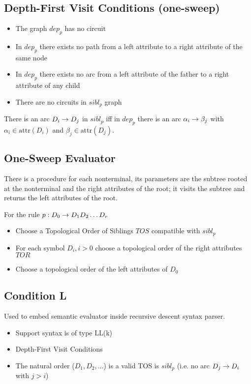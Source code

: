 \subsection{Depth-First Visit Conditions (one-sweep)}
\begin{itemize}
    \item The graph $dep_p$ has no circuit
    \item In $dep_p$ there exists no path from a left attribute to a right attribute of the same node
    \item In $dep_p$ there exists no arc from a left attribute of the father to a right attribute of any child
    \item There are no circuits in $sibl_p$ graph
\end{itemize}

There is an arc $D_i \rightarrow D_j$ in $sibl_p$ iff in $dep_p$ there is an arc $\alpha_i \rightarrow \beta_j$ with $\alpha_i \in \text{attr}(D_i)$ and $\beta_j \in \text{attr}(D_j)$.

\subsection{One-Sweep Evaluator}
There is a procedure for each nonterminal, its parameters are the subtree rooted at the nonterminal and the right attributes of the root; it visits the subtree and returns the left attributes of the root.

For the rule $p: D_0 \rightarrow D_1D_2\ldots D_r$
\begin{itemize}
    \item Choose a Topological Order of Siblings $TOS$ compatible with $sibl_p$
    \item For each symbol $D_i, i>0$ choose a topological order of the right attributes $TOR$
    \item Choose a topological order of the left attributes of $D_0$
\end{itemize}

\subsection{Condition L}
Used to embed semantic evaluator inside recursive descent syntax parser.
\begin{itemize}
    \item Support syntax is of type LL(k)
    \item Depth-First Visit Conditions
    \item The natural order ($D_1, D_2, \ldots$) is a valid TOS is $sibl_p$ (i.e. no arc $D_j\rightarrow D_i$ with $j>i$)
\end{itemize}
